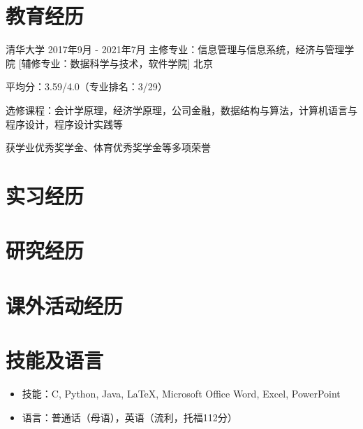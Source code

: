 \documentclass{resumeZH}
\begin{document}

\section{教育经历}
\Experience
{清华大学}
{2017年9月 - 2021年7月}
{主修专业：信息管理与信息系统，经济与管理学院}
[辅修专业：数据科学与技术，软件学院]
{北京}{
    \item 平均分：3.59/4.0（专业排名：3/29）
    \item 选修课程：会计学原理，经济学原理，公司金融，数据结构与算法，计算机语言与程序设计，程序设计实践等
    \item 获学业优秀奖学金、体育优秀奖学金等多项荣誉
}

\section{实习经历}

\summitview

\section{研究经历}

\fifaresearch

\section{课外活动经历}

\cydp

\tkd

\semtech

\section{技能及语言}
\vspace{0.618ex}
\begin{itemize}
    \item 技能：C, Python, Java, {\LaTeX}, Microsoft Office Word, Excel, PowerPoint
    \item 语言：普通话（母语），英语（流利，托福112分）
\end{itemize}
\end{document}
